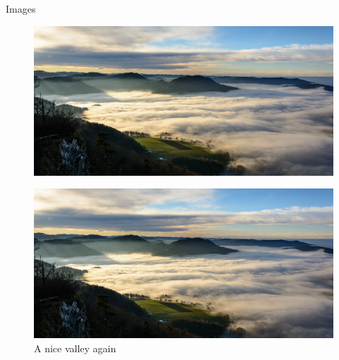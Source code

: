 \documentclass[10pt,compress]{beamer}
\begin{document}
\begin{frame}{Images}

\begin{figure}[htbp]
\centering
\includegraphics{images/valley.jpg}
\caption{}
\end{figure}

\end{frame}

\begin{frame}

\begin{figure}[htbp]
\centering
\includegraphics{images/valley.jpg}
\caption{A nice valley again}
\end{figure}

\end{frame}
\end{document}
